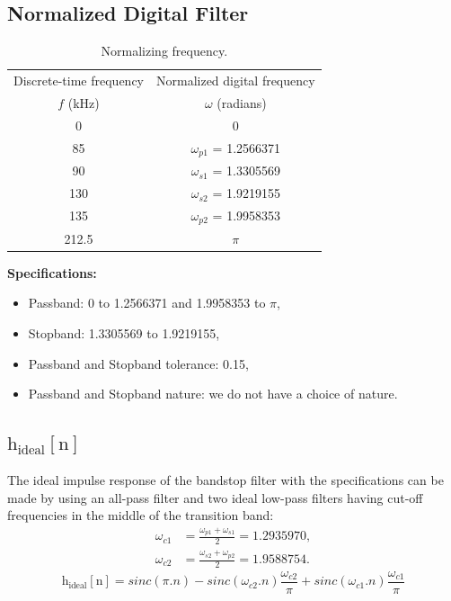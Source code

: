 \documentclass[12pt]{article}
\begin{document}
\subsection{Normalized Digital Filter}

\begin{table}[h]
    \centering
    \begin{tabular}{|c|c|}\hline
         Discrete-time frequency&Normalized digital frequency\\
         $f$ (kHz)&$\omega$ (radians)\\\hline
         0&0\\\hline
         85&$\omega_{p1}$ = 1.2566371\\\hline
         90&$\omega_{s1}$ = 1.3305569\\\hline
         130&$\omega_{s2}$ = 1.9219155\\\hline
         135&$\omega_{p2}$ = 1.9958353\\\hline
         212.5&$\pi$\\\hline
    \end{tabular}
    \caption{Normalizing frequency.}
    \label{tab:1}
\end{table}
\newline
\hline
\vspace{10pt}
\textbf{Specifications:}
\begin{itemize}
    \item Passband: 0 to 1.2566371 and 1.9958353 to  $\pi$,
    \item Stopband: 1.3305569 to 1.9219155,
    \item Passband and Stopband tolerance: 0.15,
    \item Passband and Stopband nature: we do not have a choice of nature.
\end{itemize}
\hline

\newpage
\subsection{$\text{h}_\text{ideal}[\text{n}]$}
The ideal impulse response of the bandstop filter with the specifications can be made by using an all-pass filter and two ideal low-pass filters having cut-off frequencies in the middle of the transition band:
\begin{align*}
    \omega_{c1} &= \frac{\omega_{p1} + \omega_{s1}}{2} = 1.2935970,\\
    \omega_{c2} &= \frac{\omega_{s2} + \omega_{p2}}{2} = 1.9588754.
\end{align*}
\[\text{h}_\text{ideal}[\text{n}] = sinc(\pi.n) - sinc(\omega_{c2}.n)\frac{\omega_{c2}}{\pi} + sinc(\omega_{c1}.n)\frac{\omega_{c1}}{\pi}\]
\end{document}
